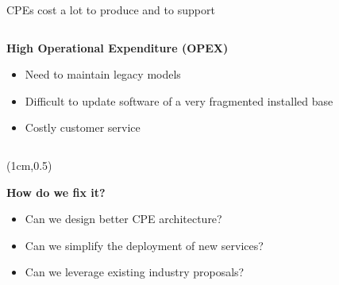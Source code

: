 \documentclass[a4paper]{beamer}
\begin{document}
\begin{frame}{CPEs cost a lot to produce and to support}
\begin{columns}[T]
																										
		\begin{column}[T]{0.75 \textwidth} %
																																							
																																								   
			\textbf{ High Operational Expenditure (OPEX)}
			\begin{itemize}
				\item Need to maintain legacy models
				\item Difficult to update software of a very fragmented installed base
				\item Costly customer service 
			\end{itemize}
																																								     
																																							
		\end{column}
																										
	\end{columns}
											
										
	\begin{textblock*}{10cm}(1cm,0.5\textheight)
		\begin{alertblock}{}
			\textbf{  How do we fix it? }
			\begin{itemize}
				\item Can we design better CPE architecture?
				\item Can we simplify the deployment of new services?
				\item Can we leverage existing industry proposals?
			\end{itemize}
		\end{alertblock}
	\end{textblock*}
											
\end{frame}
\end{document}
